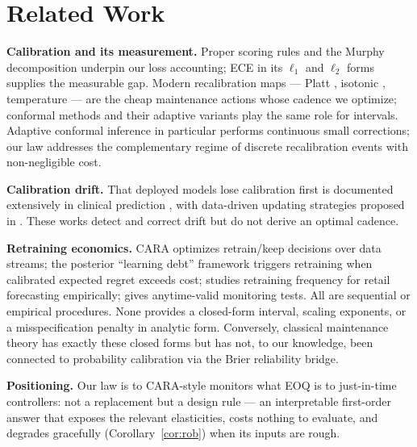\documentclass[conference]{IEEEtran}
\begin{document}
\section{Related Work}
\label{sec:related}

\textbf{Calibration and its measurement.} Proper scoring rules
\cite{brier1950,gneiting2007} and the Murphy decomposition \cite{murphy1973}
underpin our loss accounting; ECE in its $\ell_1$ and $\ell_2$ forms
\cite{naeini2015,kumar2019} supplies the measurable gap. Modern recalibration
maps --- Platt \cite{platt1999}, isotonic \cite{zadrozny2002}, temperature
\cite{guo2017} --- are the cheap maintenance actions whose cadence we
optimize; conformal methods \cite{vovk2005} and their adaptive variants
\cite{gibbs2021} play the same role for intervals. Adaptive conformal
inference \cite{gibbs2021} in particular performs continuous small
corrections; our law addresses the complementary regime of discrete
recalibration events with non-negligible cost.

\textbf{Calibration drift.} That deployed models lose calibration first is
documented extensively in clinical prediction \cite{davis2017drift}, with
data-driven updating strategies proposed in \cite{davis2020updating}. These
works detect and correct drift but do not derive an optimal cadence.

\textbf{Retraining economics.} CARA \cite{mahadevan2024cara} optimizes
retrain/keep decisions over data streams; the posterior ``learning debt''
framework \cite{learningdebt2026} triggers retraining when calibrated
expected regret exceeds cost; \cite{retrainfreq2025} studies retraining
frequency for retail forecasting empirically; \cite{anytimevalid2026} gives
anytime-valid monitoring tests. All are sequential or empirical procedures.
None provides a closed-form interval, scaling exponents, or a
misspecification penalty in analytic form. Conversely, classical maintenance
theory \cite{harris1913,barlow1965,ross1996} has exactly these closed forms
but has not, to our knowledge, been connected to probability calibration via
the Brier reliability bridge.

\textbf{Positioning.} Our law is to CARA-style monitors what EOQ is to
just-in-time controllers: not a replacement but a design rule --- an
interpretable first-order answer that exposes the relevant elasticities,
costs nothing to evaluate, and degrades gracefully (Corollary~\ref{cor:rob})
when its inputs are rough.
\end{document}

